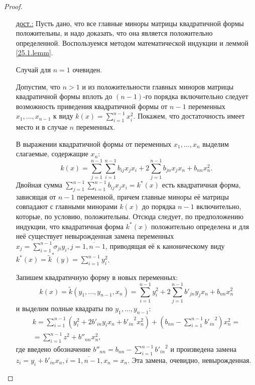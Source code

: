   \begin{proof} $ $
  \linebreak\vspace*{-\baselineskip}
  \begin{itemize}
  \item[\underline{дост.:}] Пусть дано, что все главные миноры матрицы квадратичной формы положительны, и надо доказать, что она является положительно определенной. Воспользуемся методом математической индукции и леммой \ref{25.1.lemm}. 

  Случай для \underline{$n=1$} очевиден. 
  
  Допустим, что \underline{$n>1$} и из положительности главных миноров матрицы квадратичной формы вплоть до $(n-1)$-го порядка включительно следует возможность приведения квадратичной формы от $n-1$ переменных $x_1,...,x_{n-1}$ к виду $k(x)=\sum\limits_{i=1}^{n-1}x_i^2$. Покажем, что достаточность имеет место и в случае $n$ переменных.
  
  В выражении квадратичной формы от переменных $x_1,...,x_n$ выделим слагаемые, содержащие $x_n$:
  \begin{equation*}
  k(x)=\sum_{j=1}^{n-1}\sum_{i=1}^{n-1}b_{ij}x_jx_i+2\sum_{j=1}^{n-1}b_{jn}x_jx_n+b_{nn}x_n^2.
  \end{equation*}
  Двойная сумма $\sum\limits_{j=1}^{n-1}\sum\limits_{i=1}^{n-1}b_{ij}x_jx_i=k^*(x)$ есть квадратичная форма, зависящая от $n-1$ переменной, причем главные миноры её матрицы совпадают с главными минорами $k(x)$ до порядка $n-1$ включительно, которые, по условию, положительны. Отсюда следует, по предположению индукции, что квадратичная форма $k^*(x)$ положительно определена и для неё существует невырожденная замена переменных $x_j=\sum\limits_{i=1}^{n-1}\sigma_{ji}y_i, j=\overline{1,n-1}$, приводящая её к каноническому виду $k^*(x)=\widetilde k^*(y)=\sum\limits_{i=1}^{n-1}y_i^2$.
  
  Запишем квадратичную форму в новых переменных:
  \begin{equation*}
  k(x)=\widetilde k(y_1,...,y_{n-1},x_n)=\sum\limits_{i=1}^{n-1}y_i^2+2\sum_{j=1}^{n-1}b'_{jn}y_jx_n+b_{nn}x_n^2
  \end{equation*}
и выделим полные квадраты по $y_1,...,y_{n-1}$:
  \begin{equation*}\begin{array}{crl}
  k=\sum\limits_{i=1}^{n-1}(y_i^2+2b'_{in}y_ix_n+{b'_{in}}^2x_n^2)+(b_{nn}-\sum\limits_{i=1}^{n-1}{b'_{in}}^2)x_n^2 =\\
  =\sum\limits_{i=1}^{n-1}z^2+b''_{nn}x_n^2,
  \end{array}\end{equation*}
где введено обозначение $ b''_{nn}=b_{nn}-\sum\limits_{i=1}^{n-1}{b'_{in}}^2 $ и произведена замена $z_i=y_i+b'_{in}x_n, i=\overline{1,n-1}, x_n=x_n$. Эта замена, очевидно, невырожденная.


\end{itemize}
\end{proof}
